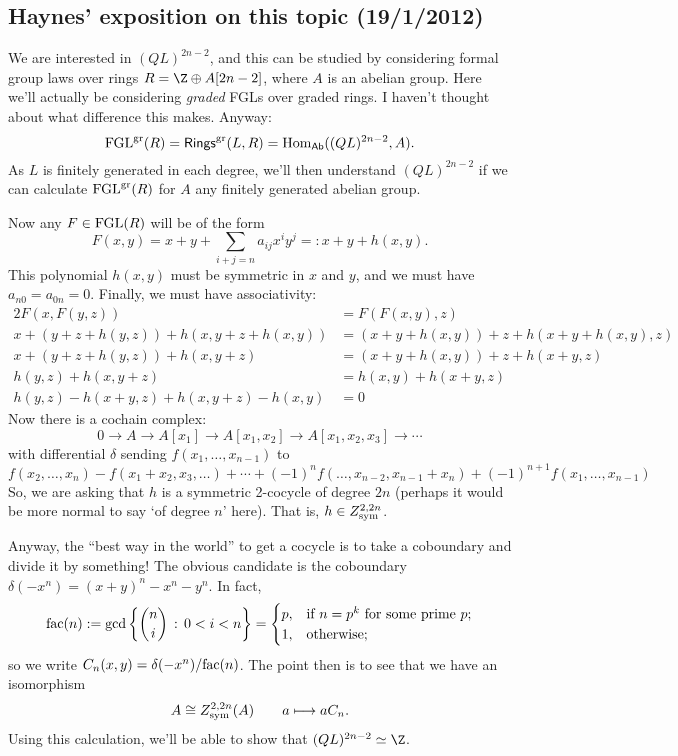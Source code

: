\documentclass[11pt]{article}
\begin{document}
\begin{Formal Group Laws}
\begin{shaded}
\subsection*{Haynes' exposition on this topic (19/1/2012)}
We are interested in $(QL)^{2n-2}$, and this can be studied by considering formal group laws over rings $R=\Z\oplus A[2n-2]$, where $A$ is an abelian group. Here we'll actually be considering \emph{graded} FGLs over graded rings. I haven't thought about what difference this makes. Anyway:
\[\FGL^{\textup{gr}}(R)=\Rings^\textup{gr}(L,R)=\Hom_{\mathsf{Ab}}((QL)^{2n-2},A).\]
As $L$ is finitely generated in each degree, we'll then understand $(QL)^{2n-2}$ if we can calculate $\FGL^{\textup{gr}}(R)$ for $A$ any finitely generated abelian group.

Now any $F\in\FGL(R)$ will be of the form 
\[F(x,y)=x+y+\sum_{i+j=n}a_{ij}x^iy^j=:x+y+h(x,y).\]
This polynomial $h(x,y)$ must be symmetric in $x$ and $y$, and we must have $a_{n0}=a_{0n}=0$. Finally, we must have associativity:
\begin{alignat*}{2}
F(x,F(y,z))
&=
F(F(x,y),z)%
\\
x+(y+z+h(y,z))+h(x,y+z+h(x,y))
&=
(x+y+h(x,y))+z+h(x+y+h(x,y),z)%
\\
x+(y+z+h(y,z))+h(x,y+z)
&=
(x+y+h(x,y))+z+h(x+y,z)%
\\
h(y,z)+h(x,y+z)
&=
h(x,y)+h(x+y,z)%
\\
h(y,z)-h(x+y,z)+h(x,y+z)-h(x,y)
&=
0
\end{alignat*}
Now there is a cochain complex:
\[0\to A\to A[x_1]\to A[x_1,x_2]\to A[x_1,x_2,x_3]\to\cdots\]
with differential $\delta$ sending $f(x_1,\ldots,x_{n-1})$ to
\[f(x_2,\ldots,x_n)-f(x_1+x_2,x_3,\ldots)+\cdots+(-1)^{n} f(\ldots,x_{n-2},x_{n-1}+x_n)+(-1)^{n+1} f(x_1,\ldots,x_{n-1})\]
So, we are asking that $h$ is a symmetric 2-cocycle of degree $2n$ (perhaps it would be more normal to say `of degree $n$' here). That is, $h\in Z_{\textup{sym}}^{2,2n}$.

\INDENT Anyway, the ``best way in the world'' to get a cocycle is to take a coboundary and divide it by something! The obvious candidate is the coboundary $\delta(-x^n)=(x+y)^n-x^n-y^n$. In fact, 
\[\textup{fac}(n):=\gcd\left\{{n\choose i}\,:\,0<i<n\right\}=
\begin{cases}
p,&\textup{if }n=p^k\textup{ for some prime $p$};\\
1,&\textup{otherwise};
\end{cases}\]
so we write $C_n(x,y)=\delta(-x^n)/\textup{fac}(n)$. The point then is to see that we have an isomorphism
\[A\cong Z^{2,2n}_{\textup{sym}}(A)\qquad a\mapsto aC_n.\]
Using this calculation, we'll be able to show that $(QL)^{2n-2}\simeq \Z$.


\end{shaded}
\end{Formal Group Laws}
\end{document}
